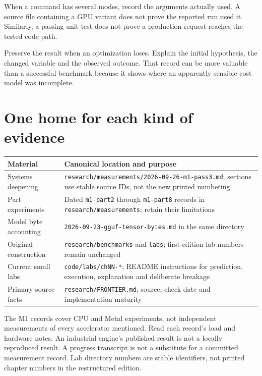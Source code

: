 When a command has several modes, record the arguments actually
used. A source file containing a GPU variant does not prove the
reported run used it. Similarly, a passing unit test does not prove
a production request reaches the tested code path.

Preserve the result when an optimization loses. Explain the initial
hypothesis, the changed variable and the observed outcome. That
record can be more valuable than a successful benchmark because it
shows where an apparently sensible cost model was incomplete.

\section{One home for each kind of evidence}
\begin{longtable}{@{}p{.28\linewidth}p{.63\linewidth}@{}}
\toprule Material & Canonical location and purpose\\\midrule
\endhead
Systems deepening & \texttt{research/measurements/2026-09-26-m1-pass3.md};
sections use stable source IDs, not the new printed numbering\\
Part experiments & Dated \texttt{m1-part2} through \texttt{m1-part8} records
in \texttt{research/measurements}; retain their limitations\\
Model byte accounting & \texttt{2026-09-23-gguf-tensor-bytes.md}
in the same directory\\
Original construction & \texttt{research/benchmarks} and \texttt{labs};
first-edition lab numbers remain unchanged\\
Current small labs & \texttt{code/labs/chNN-*}; README instructions for
prediction, execution, explanation and deliberate breakage\\
Primary-source facts & \texttt{research/FRONTIER.md}; source, check date
and implementation maturity\\
\bottomrule
\end{longtable}

The M1 records cover CPU and Metal experiments, not independent measurements
of every accelerator mentioned. Read each record's load and hardware notes.
An industrial engine's published result is not a locally reproduced result.
A progress transcript is not a substitute for a committed measurement
record. Lab directory numbers are stable identifiers, not printed chapter
numbers in the restructured edition.

